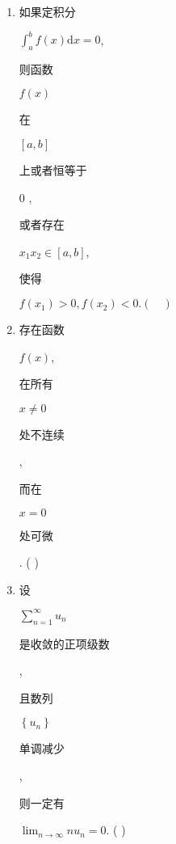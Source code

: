\documentclass[10pt]{article}
\begin{document}
\begin{enumerate}
  \item \begin{CJK}{UTF8}{mj}如果定积分\end{CJK} $\int_{a}^{b} f(x) \mathrm{d} x=0$, \begin{CJK}{UTF8}{mj}则函数\end{CJK} $f(x)$ \begin{CJK}{UTF8}{mj}在\end{CJK} $[a, b]$ \begin{CJK}{UTF8}{mj}上或者恒等于\end{CJK} 0 , \begin{CJK}{UTF8}{mj}或者存在\end{CJK} $x_{1} x_{2} \in[a, b]$, \begin{CJK}{UTF8}{mj}使得\end{CJK} $f\left(x_{1}\right)>0, f\left(x_{2}\right)<0 .(\quad)$

  \item \begin{CJK}{UTF8}{mj}存在函数\end{CJK} $f(x)$, \begin{CJK}{UTF8}{mj}在所有\end{CJK} $x \neq 0$ \begin{CJK}{UTF8}{mj}处不连续\end{CJK}, \begin{CJK}{UTF8}{mj}而在\end{CJK} $x=0$ \begin{CJK}{UTF8}{mj}处可微\end{CJK}. ( )

  \item \begin{CJK}{UTF8}{mj}设\end{CJK} $\sum_{n=1}^{\infty} u_{n}$ \begin{CJK}{UTF8}{mj}是收敛的正项级数\end{CJK}, \begin{CJK}{UTF8}{mj}且数列\end{CJK} $\left\{u_{n}\right\}$ \begin{CJK}{UTF8}{mj}单调减少\end{CJK}, \begin{CJK}{UTF8}{mj}则一定有\end{CJK} $\lim _{n \rightarrow \infty} n u_{n}=0$. ( )

\end{enumerate}
\end{document}
